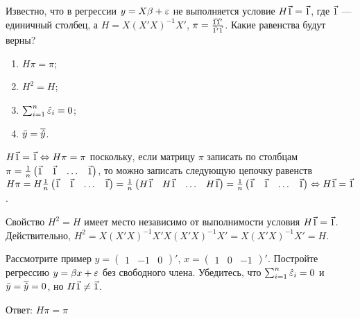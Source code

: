 \begin{problem}
Известно, что в регрессии $y = X\beta + \varepsilon$ не выполняется условие $H\v1 = \v1$, где $\v1$ — единичный столбец, а $H = X(X'X)^{-1}X'$, $\pi = \frac{\v1\v1'}{\v1'\v1}$. Какие равенства будут верны?
\begin{enumerate}
\item $H\pi = \pi$;
\item $H^2 = H$;
\item $\sum_{i=1}^n \hat{\varepsilon}_i = 0$;
\item $\bar{y} = \overline{\hat{y}}$.
\end{enumerate}


\begin{sol}
$H\v1 = \v1 \Leftrightarrow H\pi = \pi$ поскольку, если матрицу $\pi$ записать по столбцам $\pi = \frac{1}{n}\begin{pmatrix}
\v1 & \v1 & \ldots & \v1
\end{pmatrix}$, то можно записать следующую цепочку равенств $H\pi = H\frac{1}{n}\begin{pmatrix}
\v1 & \v1 & \ldots & \v1
\end{pmatrix} = \frac{1}{n}\begin{pmatrix}
H\v1 & H\v1 & \ldots & H\v1
\end{pmatrix} = \frac{1}{n}\begin{pmatrix}
\v1 & \v1 & \ldots & \v1
\end{pmatrix} \Leftrightarrow H\v1 = \v1$.

Свойство $H^2 = H$ имеет место независимо от выполнимости условия $H\v1 = \v1$. Действительно, $H^2 = X (X' X)^{-1}X'X(X'X)^{-1}X' = X(X'X)^{-1}X' = H$.

Рассмотрите пример $y = \begin{pmatrix}
1 & -1 & 0
\end{pmatrix}'$, $x = \begin{pmatrix}
1 & 0 & -1
\end{pmatrix}'$. Постройте регрессию $y = \beta x + \varepsilon$ без свободного члена. Убедитесь, что $\sum_{i=1}^n \hat{\varepsilon}_i = 0$ и $\bar{y} = \overline{\hat{y}} = 0$, но $H\v1 \neq \v1$.


Ответ: $H\pi = \pi$
\end{sol}
\end{problem}




